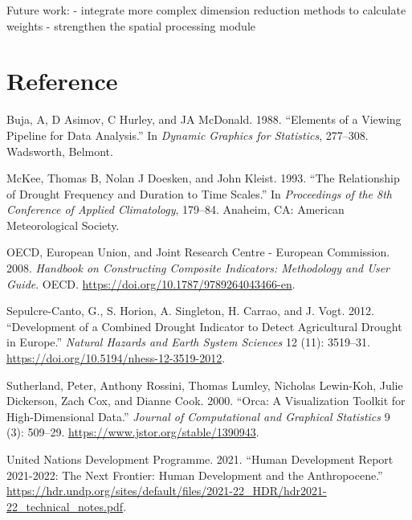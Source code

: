 \documentclass[
]{interact}
\newlength{\cslhangindent}
\newlength{\cslentryspacingunit} %
\newenvironment{CSLReferences}[2] %
 {%
  \setlength{\parindent}{0pt}
  \ifodd #1
  \let\oldpar\par
  \def\par{\hangindent=\cslhangindent\oldpar}
  \fi
  \setlength{\parskip}{#2\cslentryspacingunit}
 }%
 {}
\begin{document}
Future work: - integrate more complex dimension reduction methods to
calculate weights - strengthen the spatial processing module

\hypertarget{reference}{%
\section*{Reference}\label{reference}}

\hypertarget{refs}{}
\begin{CSLReferences}{1}{0}
\leavevmode{}%
Buja, A, D Asimov, C Hurley, and JA McDonald. 1988. {``Elements of a
Viewing Pipeline for Data Analysis.''} In \emph{Dynamic Graphics for
Statistics}, 277--308. Wadsworth, Belmont.

\leavevmode{}%
McKee, Thomas B, Nolan J Doesken, and John Kleist. 1993. {``The
Relationship of Drought Frequency and Duration to Time Scales.''} In
\emph{Proceedings of the 8th Conference of Applied Climatology},
179--84. Anaheim, CA: American Meteorological Society.

\leavevmode{}%
OECD, European Union, and Joint Research Centre - European Commission.
2008. \emph{Handbook on {Constructing} {Composite} {Indicators}:
{Methodology} and {User} {Guide}}. OECD.
\url{https://doi.org/10.1787/9789264043466-en}.

\leavevmode{}%
Sepulcre-Canto, G., S. Horion, A. Singleton, H. Carrao, and J. Vogt.
2012. {``Development of a {Combined} {Drought} {Indicator} to Detect
Agricultural Drought in {Europe}.''} \emph{Natural Hazards and Earth
System Sciences} 12 (11): 3519--31.
\url{https://doi.org/10.5194/nhess-12-3519-2012}.

\leavevmode{}%
Sutherland, Peter, Anthony Rossini, Thomas Lumley, Nicholas Lewin-Koh,
Julie Dickerson, Zach Cox, and Dianne Cook. 2000. {``Orca: {A}
{Visualization} {Toolkit} for {High}-{Dimensional} {Data}.''}
\emph{Journal of Computational and Graphical Statistics} 9 (3): 509--29.
\url{https://www.jstor.org/stable/1390943}.

\leavevmode{}%
United Nations Development Programme. 2021. {``Human Development Report
2021-2022: The Next Frontier: Human Development and the Anthropocene.''}
\url{https://hdr.undp.org/sites/default/files/2021-22_HDR/hdr2021-22_technical_notes.pdf}.


\end{CSLReferences}
\end{document}
